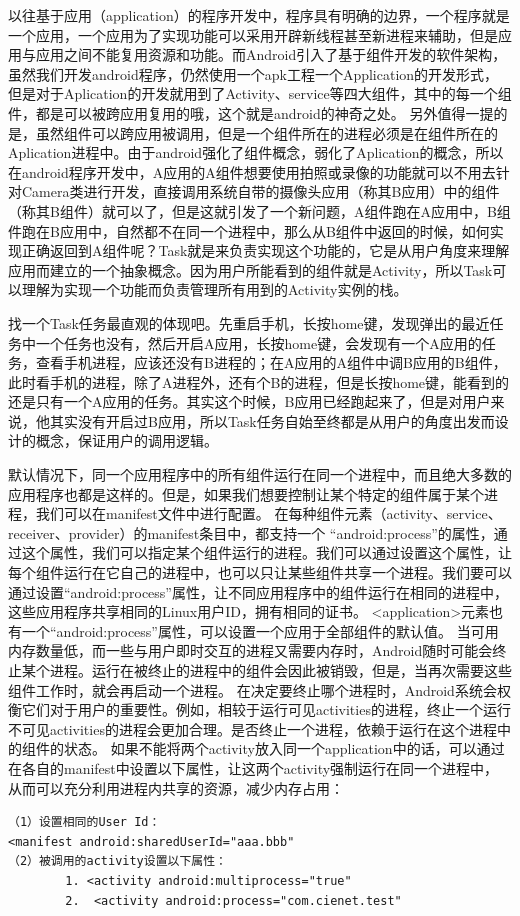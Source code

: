 \documentclass[a4paper, 11pt]{article}
\begin{document}
以往基于应用（application）的程序开发中，程序具有明确的边界，一个程序就是一个应用，一个应用为了实现功能可以采用开辟新线程甚至新进程来辅助，但是应用与应用之间不能复用资源和功能。而Android引入了基于组件开发的软件架构，虽然我们开发android程序，仍然使用一个apk工程一个Application的开发形式，但是对于Aplication的开发就用到了Activity、service等四大组件，其中的每一个组件，都是可以被跨应用复用的哦，这个就是android的神奇之处。
另外值得一提的是，虽然组件可以跨应用被调用，但是一个组件所在的进程必须是在组件所在的Aplication进程中。由于android强化了组件概念，弱化了Aplication的概念，所以在android程序开发中，A应用的A组件想要使用拍照或录像的功能就可以不用去针对Camera类进行开发，直接调用系统自带的摄像头应用（称其B应用）中的组件（称其B组件）就可以了，但是这就引发了一个新问题，A组件跑在A应用中，B组件跑在B应用中，自然都不在同一个进程中，那么从B组件中返回的时候，如何实现正确返回到A组件呢？Task就是来负责实现这个功能的，它是从用户角度来理解应用而建立的一个抽象概念。因为用户所能看到的组件就是Activity，所以Task可以理解为实现一个功能而负责管理所有用到的Activity实例的栈。

找一个Task任务最直观的体现吧。先重启手机，长按home键，发现弹出的最近任务中一个任务也没有，然后开启A应用，长按home键，会发现有一个A应用的任务，查看手机进程，应该还没有B进程的；在A应用的A组件中调B应用的B组件，此时看手机的进程，除了A进程外，还有个B的进程，但是长按home键，能看到的还是只有一个A应用的任务。其实这个时候，B应用已经跑起来了，但是对用户来说，他其实没有开启过B应用，所以Task任务自始至终都是从用户的角度出发而设计的概念，保证用户的调用逻辑。


默认情况下，同一个应用程序中的所有组件运行在同一个进程中，而且绝大多数的应用程序也都是这样的。但是，如果我们想要控制让某个特定的组件属于某个进程，我们可以在manifest文件中进行配置。 
在每种组件元素（activity、service、receiver、provider）的manifest条目中，都支持一个 “android:process”的属性，通过这个属性，我们可以指定某个组件运行的进程。我们可以通过设置这个属性，让每个组件运行在它自己的进程中，也可以只让某些组件共享一个进程。我们要可以通过设置“android:process”属性，让不同应用程序中的组件运行在相同的进程中，这些应用程序共享相同的Linux用户ID，拥有相同的证书。 
<application>元素也有一个“android:process”属性，可以设置一个应用于全部组件的默认值。 
    当可用内存数量低，而一些与用户即时交互的进程又需要内存时，Android随时可能会终止某个进程。运行在被终止的进程中的组件会因此被销毁，但是，当再次需要这些组件工作时，就会再启动一个进程。 
    在决定要终止哪个进程时，Android系统会权衡它们对于用户的重要性。例如，相较于运行可见activities的进程，终止一个运行不可见activities的进程会更加合理。是否终止一个进程，依赖于运行在这个进程中的组件的状态。 
如果不能将两个activity放入同一个application中的话，可以通过在各自的manifest中设置以下属性，让这两个activity强制运行在同一个进程中，从而可以充分利用进程内共享的资源，减少内存占用：
\begin{verbatim}
（1）设置相同的User Id：  
<manifest android:sharedUserId="aaa.bbb"  
（2）被调用的activity设置以下属性：  
        1. <activity android:multiprocess="true"  
        2.  <activity android:process="com.cienet.test"  

\end{verbatim}
\end{document}
